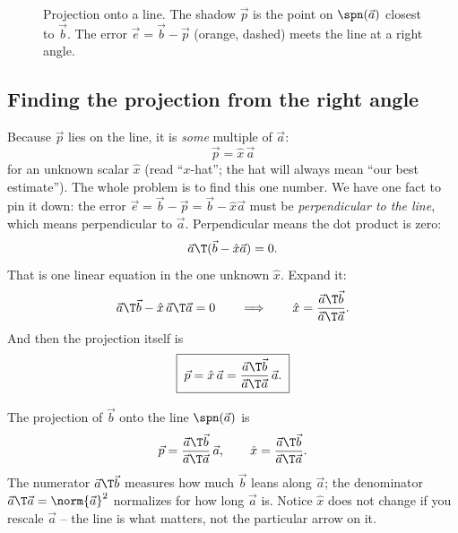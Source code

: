 \begin{figure}[H]
\centering
{}
\caption{Projection onto a line. The shadow $\vec{p}$ is the point on $\spn(\vec{a})$ closest to
$\vec{b}$. The error $\vec{e}=\vec{b}-\vec{p}$ (orange, dashed) meets the line at a right angle.}
\label{ch18:project-line}
\end{figure}

\subsection{Finding the projection from the right angle}

Because $\vec{p}$ lies on the line, it is \emph{some} multiple of $\vec{a}$:
\[
  \vec{p} = \hat{x}\,\vec{a}
\]
for an unknown scalar $\hat{x}$ (read ``$x$-hat''; the hat will always mean ``our best estimate'').
The whole problem is to find this one number. We have one fact to pin it down: the error
$\vec{e} = \vec{b} - \vec{p} = \vec{b} - \hat{x}\vec{a}$ must be \emph{perpendicular to the line},
which means perpendicular to $\vec{a}$. Perpendicular means the dot product is zero:
\[
  \vec{a}\T(\vec{b} - \hat{x}\vec{a}) = 0.
\]
That is one linear equation in the one unknown $\hat{x}$. Expand it:
\[
  \vec{a}\T\vec{b} - \hat{x}\,\vec{a}\T\vec{a} = 0
  \qquad\Longrightarrow\qquad
  \hat{x} = \frac{\vec{a}\T\vec{b}}{\vec{a}\T\vec{a}}.
\]
And then the projection itself is
\[
  \boxed{\;\vec{p} = \hat{x}\,\vec{a} = \frac{\vec{a}\T\vec{b}}{\vec{a}\T\vec{a}}\,\vec{a}.\;}
\]

\begin{focusbox}
The projection of $\vec{b}$ onto the line $\spn(\vec{a})$ is
\[
  \vec{p} = \frac{\vec{a}\T\vec{b}}{\vec{a}\T\vec{a}}\,\vec{a},
  \qquad
  \hat{x} = \frac{\vec{a}\T\vec{b}}{\vec{a}\T\vec{a}}.
\]
The numerator $\vec{a}\T\vec{b}$ measures how much $\vec{b}$ leans along $\vec{a}$; the denominator
$\vec{a}\T\vec{a}=\norm{\vec{a}}^2$ normalizes for how long $\vec{a}$ is. Notice $\hat{x}$ does not
change if you rescale $\vec{a}$ -- the line is what matters, not the particular arrow on it.
\end{focusbox}

